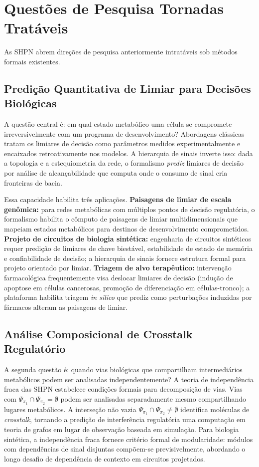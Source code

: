 \section{Questões de Pesquisa Tornadas Tratáveis}
\label{sec:questoes-trataveis}

As SHPN abrem direções de pesquisa anteriormente intratáveis sob métodos formais
existentes.

\subsection{Predição Quantitativa de Limiar para Decisões Biológicas}

A questão central é: em qual estado metabólico uma célula se compromete
irreversivelmente com um programa de desenvolvimento?
Abordagens clássicas tratam os limiares de decisão como parâmetros
medidos experimentalmente e encaixados retroativamente nos modelos.
A hierarquia de sinais inverte isso: dada a topologia e a estequiometria da
rede, o formalismo \emph{prediz} limiares de decisão por análise de
alcançabilidade que computa onde o consumo de sinal cria fronteiras de bacia.

Essa capacidade habilita três aplicações.
\textbf{Paisagens de limiar de escala genômica:} para redes metabólicas com
múltiplos pontos de decisão regulatória, o formalismo habilita o cômputo de
paisagens de limiar multidimensionais que mapeiam estados metabólicos para
destinos de desenvolvimento comprometidos.
\textbf{Projeto de circuitos de biologia sintética:} engenharia de circuitos
sintéticos requer predição de limiares de chave biestável, estabilidade de
estado de memória e confiabilidade de decisão; a hierarquia de sinais fornece
estrutura formal para projeto orientado por limiar.
\textbf{Triagem de alvo terapêutico:} intervenção farmacológica frequentemente
visa deslocar limiares de decisão (indução de apoptose em células
cancerosas, promoção de diferenciação em células-tronco); a plataforma habilita
triagem \textit{in silico} que prediz como perturbações induzidas por fármacos
alteram as paisagens de limiar.

\subsection{Análise Composicional de Crosstalk Regulatório}

A segunda questão é: quando vias biológicas que compartilham intermediários
metabólicos podem ser analisadas independentemente?
A teoria de independência fraca das SHPN estabelece condições formais para
decomposição de vias.
Vias com $\Psi_{\pi_1} \cap \Psi_{\pi_2} = \emptyset$ podem ser analisadas
separadamente mesmo compartilhando lugares metabólicos.
A interseção não vazia $\Psi_{\pi_1} \cap \Psi_{\pi_2} \neq \emptyset$
identifica moléculas de \textit{crosstalk}, tornando a predição de interferência
regulatória uma computação em teoria de grafos em lugar de observação baseada
em simulação.
Para biologia sintética, a independência fraca fornece critério formal de
modularidade: módulos com dependências de sinal disjuntas compõem-se
previsivelmente, abordando o longo desafio de dependência de contexto em
circuitos projetados.

